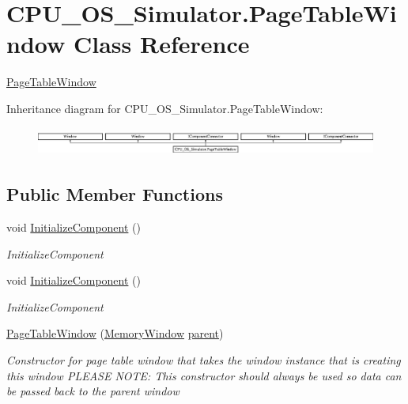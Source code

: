 \hypertarget{class_c_p_u___o_s___simulator_1_1_page_table_window}{}\section{C\+P\+U\+\_\+\+O\+S\+\_\+\+Simulator.\+Page\+Table\+Window Class Reference}
\label{class_c_p_u___o_s___simulator_1_1_page_table_window}


\hyperlink{class_c_p_u___o_s___simulator_1_1_page_table_window}{Page\+Table\+Window}  


Inheritance diagram for C\+P\+U\+\_\+\+O\+S\+\_\+\+Simulator.\+Page\+Table\+Window\+:\begin{figure}[H]
\begin{center}
\leavevmode
\includegraphics[height=0.945148cm]{class_c_p_u___o_s___simulator_1_1_page_table_window}
\end{center}
\end{figure}
\subsection*{Public Member Functions}
\begin{DoxyCompactItemize}
\item 
void \hyperlink{class_c_p_u___o_s___simulator_1_1_page_table_window_aac86b3b08e7e32708ac357042af6cbb2}{Initialize\+Component} ()
\begin{DoxyCompactList}\small\item\em Initialize\+Component \end{DoxyCompactList}\item 
void \hyperlink{class_c_p_u___o_s___simulator_1_1_page_table_window_aac86b3b08e7e32708ac357042af6cbb2}{Initialize\+Component} ()
\begin{DoxyCompactList}\small\item\em Initialize\+Component \end{DoxyCompactList}\item 
\hyperlink{class_c_p_u___o_s___simulator_1_1_page_table_window_a7d71ad4194ceafa3573e5f65e8dbe90a}{Page\+Table\+Window} (\hyperlink{class_c_p_u___o_s___simulator_1_1_memory_window}{Memory\+Window} \hyperlink{class_c_p_u___o_s___simulator_1_1_page_table_window_a1903e0b83820829549f74207cd209337}{parent})
\begin{DoxyCompactList}\small\item\em Constructor for page table window that takes the window instance that is creating this window P\+L\+E\+A\+S\+E N\+O\+T\+E\+: This constructor should always be used so data can be passed back to the parent window \end{DoxyCompactList}\end{DoxyCompactItemize}
